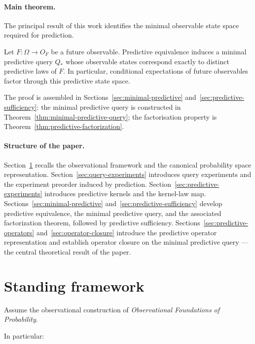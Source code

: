 \paragraph{Main theorem.}
The principal result of this work identifies the minimal observable
state space required for prediction.

\begin{theorem}\label{thm:predictive-state-theorem}
Let $F:\Omega\to O_F$ be a future observable.  Predictive equivalence
induces a minimal predictive query $Q_*$ whose observable states
correspond exactly to distinct predictive laws of $F$.  In particular,
conditional expectations of future observables factor through this
predictive state space.
\end{theorem}

\noindent The proof is assembled in Sections~\ref{sec:minimal-predictive}
and~\ref{sec:predictive-sufficiency}: the minimal predictive query
is constructed in Theorem~\ref{thm:minimal-predictive-query};
the factorisation property is Theorem~\ref{thm:predictive-factorization}.

\paragraph{Structure of the paper.}
Section~\ref{sec:standing} recalls the observational framework and
the canonical probability space representation.
Section~\ref{sec:query-experiments} introduces query experiments and
the experiment preorder induced by prediction.
Section~\ref{sec:predictive-experiments} introduces predictive kernels
and the kernel-law map.  Sections~\ref{sec:minimal-predictive}
and~\ref{sec:predictive-sufficiency} develop predictive equivalence,
the minimal predictive query, and the associated factorization theorem,
followed by predictive sufficiency.
Sections~\ref{sec:predictive-operators} and~\ref{sec:operator-closure}
introduce the predictive operator representation and establish operator
closure on the minimal predictive query --- the central theoretical
result of the paper.

\section{Standing framework}\label{sec:standing}

Assume the observational construction of
\emph{Observational Foundations of Probability}.

In particular:

